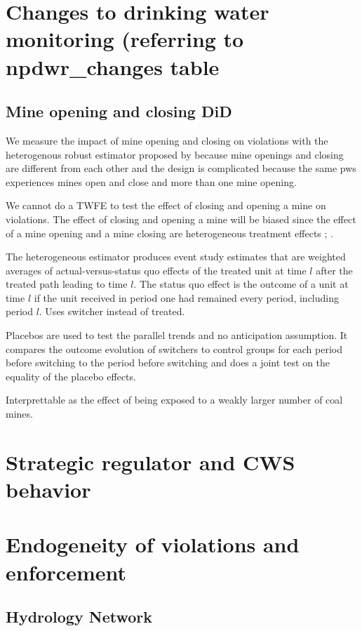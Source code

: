 \documentclass{article}
\begin{document}
\section{Changes to drinking water monitoring (referring to npdwr_changes table}



\subsection{Mine opening and closing DiD}
We measure the impact of mine opening and closing on violations with the heterogenous robust estimator proposed by \cite{de2024difference} because mine openings and closing are different from each other and the design is complicated because the same pws experiences mines open and close and more than one mine opening.

We cannot do a TWFE to test the effect of closing and opening a mine on violations. The effect of closing and opening a mine will be biased since the effect of a mine opening and a mine closing are heterogeneous treatment effects \cite{de2020two}; \cite{de2023two}.

The heterogeneous estimator produces event study estimates that are weighted averages of actual-versus-status quo effects of the treated unit at time $l$ after the treated path leading to time $l$. The status quo effect is the outcome of a unit at time $l$ if the unit received in period one had remained every period, including period $l$. Uses switcher instead of treated.

Placebos are used to test the parallel trends and no anticipation assumption. It compares the outcome evolution of switchers to control groups for each period before switching to the period before switching and does a joint test on the equality of the placebo effects.

Interprettable as the effect of being exposed to a weakly larger number of coal mines.

\section{Strategic regulator and CWS behavior}

\section{Endogeneity of violations and enforcement}



\subsection{Hydrology Network}
\end{document}
